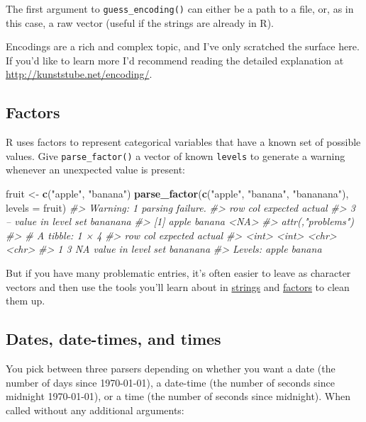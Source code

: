\documentclass[]{book}
\newenvironment{Shaded}{\begin{snugshade}}{\end{snugshade}}
\newcommand{\KeywordTok}[1]{\textcolor[rgb]{0.13,0.29,0.53}{\textbf{{#1}}}}
\newcommand{\DataTypeTok}[1]{\textcolor[rgb]{0.13,0.29,0.53}{{#1}}}
\newcommand{\StringTok}[1]{\textcolor[rgb]{0.31,0.60,0.02}{{#1}}}
\newcommand{\CommentTok}[1]{\textcolor[rgb]{0.56,0.35,0.01}{\textit{{#1}}}}
\newcommand{\NormalTok}[1]{{#1}}
\begin{document}
The first argument to \texttt{guess\_encoding()} can either be a path to
a file, or, as in this case, a raw vector (useful if the strings are
already in R).

Encodings are a rich and complex topic, and I've only scratched the
surface here. If you'd like to learn more I'd recommend reading the
detailed explanation at \url{http://kunststube.net/encoding/}.

\subsection{Factors}\label{readr-factors}

R uses factors to represent categorical variables that have a known set
of possible values. Give \texttt{parse\_factor()} a vector of known
\texttt{levels} to generate a warning whenever an unexpected value is
present:

\begin{Shaded}
\begin{Highlighting}[]
\NormalTok{fruit <-}\StringTok{ }\KeywordTok{c}\NormalTok{(}\StringTok{"apple"}\NormalTok{, }\StringTok{"banana"}\NormalTok{)}
\KeywordTok{parse_factor}\NormalTok{(}\KeywordTok{c}\NormalTok{(}\StringTok{"apple"}\NormalTok{, }\StringTok{"banana"}\NormalTok{, }\StringTok{"bananana"}\NormalTok{), }\DataTypeTok{levels =} \NormalTok{fruit)}
\CommentTok{#> Warning: 1 parsing failure.}
\CommentTok{#> row col           expected   actual}
\CommentTok{#>   3  -- value in level set bananana}
\CommentTok{#> [1] apple  banana <NA>  }
\CommentTok{#> attr(,"problems")}
\CommentTok{#> # A tibble: 1 × 4}
\CommentTok{#>     row   col           expected   actual}
\CommentTok{#>   <int> <int>              <chr>    <chr>}
\CommentTok{#> 1     3    NA value in level set bananana}
\CommentTok{#> Levels: apple banana}
\end{Highlighting}
\end{Shaded}

But if you have many problematic entries, it's often easier to leave as
character vectors and then use the tools you'll learn about in
\protect\hyperlink{strings}{strings} and
\protect\hyperlink{factors-1}{factors} to clean them up.

\hypertarget{readr-datetimes}{\subsection{Dates, date-times, and
times}\label{readr-datetimes}}

You pick between three parsers depending on whether you want a date (the
number of days since 1970-01-01), a date-time (the number of seconds
since midnight 1970-01-01), or a time (the number of seconds since
midnight). When called without any additional arguments:
\end{document}
